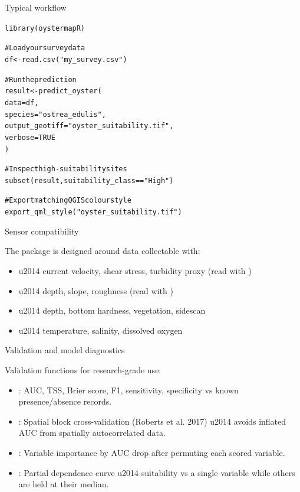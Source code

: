 \documentclass[a4paper]{book}
\begin{document}
%
\begin{Section}{Typical workflow}


\begin{alltt}library(oystermapR)

# Load your survey data
df <- read.csv("my_survey.csv")

# Run the prediction
result <- predict_oyster(
  data           = df,
  species        = "ostrea_edulis",
  output_geotiff = "oyster_suitability.tif",
  verbose        = TRUE
)

# Inspect high-suitability sites
subset(result, suitability_class == "High")

# Export matching QGIS colour style
export_qml_style("oyster_suitability.tif")
\end{alltt}

\end{Section}
%
\begin{Section}{Sensor compatibility}

The package is designed around data collectable with:
\begin{itemize}

\item{}  \bsl{}u2014 current velocity, shear stress, turbidity
proxy (read with )
\item{}  \bsl{}u2014 depth, slope, roughness
(read with )
\item{}  \bsl{}u2014 depth, bottom hardness, vegetation, sidescan
\item{}  \bsl{}u2014 temperature, salinity, dissolved oxygen

\end{itemize}

\end{Section}
%
\begin{Section}{Validation and model diagnostics}

Validation functions for research-grade use:
\begin{itemize}

\item{} : AUC, TSS, Brier score, F1, sensitivity,
specificity vs known presence/absence records.
\item{} : Spatial block cross-validation (Roberts et al. 2017)
\bsl{}u2014 avoids inflated AUC from spatially autocorrelated data.
\item{} : Variable importance by AUC drop after
permuting each scored variable.
\item{} : Partial dependence curve \bsl{}u2014 suitability vs a
single variable while others are held at their median.

\end{itemize}

\end{Section}
\end{document}
